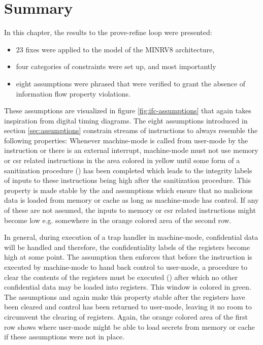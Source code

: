\section{Summary}

In this chapter, the results to the prove-refine loop were presented:
\begin{itemize}
    \item 23 fixes were applied to the model of the MINRV8 architecture,
    \item four categories of  constraints were set up, and most importantly
    \item eight assumptions were phrased that were verified to grant the absence of information flow property violations.
\end{itemize}

These assumptions are visualized in figure \ref{fig:ifc-assumptions} that again takes inspiration from digital timing diagrams.
The eight assumptions introduced in section \ref{sec:assumptions} constrain streams of instructions to always resemble the following properties:
Whenever machine-mode is called from user-mode by the  instruction or there is an external interrupt, machine-mode must not use memory or \gls{csr} related instructions in the area colored in yellow until some form of a sanitization procedure () has been completed which leads to the integrity labels of inputs to these instructions being high after the sanitization procedure.
This property is made stable by the  and  assumptions which ensure that no malicious data is loaded from memory or cache as long as machine-mode has control.
If any of these are not assumed, the inputs to memory or \gls{csr} related instructions might become low e.g. somewhere in the orange colored area of the second row.

In general, during execution of a trap handler in machine-mode, confidential data will be handled and therefore, the confidentiality labels of the registers become high at some point.
The  assumption then enforces that before the  instruction is executed by machine-mode to hand back control to user-mode, a procedure to clear the contents of the registers must be executed () after which no other confidential data may be loaded into registers.
This window is colored in green.
The assumptions  and  again make this property stable after the registers have been cleared and control has been returned to user-mode, leaving it no room to circumvent the clearing of registers.
Again, the orange colored area of the first row shows where user-mode might be able to load secrets from memory or cache if these assumptions were not in place.


